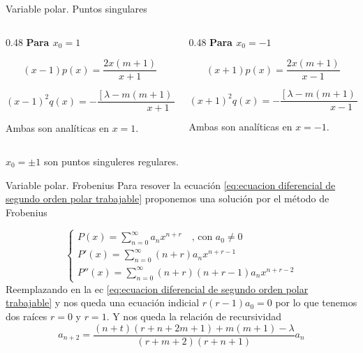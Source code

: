 \begin{frame}{Variable polar. Puntos singulares}
    \vspace{0.3cm}

    \begin{columns}[T]

        \begin{column}{0.48\textwidth}
            \centering
            \textbf{Para $x_0=1$}

            \[
                (x-1)p(x)
                =\frac{2x(m+1)}{x+1}
            \]

            \[
                (x-1)^2q(x)
                =-\frac{[\lambda-m(m+1)](x-1)}
                {x+1}
            \]

            Ambas son analíticas en $x=1$.
        \end{column}

        \begin{column}{0.48\textwidth}
            \centering
            \textbf{Para $x_0=-1$}

            \[
                (x+1)p(x)
                =\frac{2x(m+1)}{x-1}
            \]

            \[
                (x+1)^2q(x)
                =-\frac{[\lambda-m(m+1)](x+1)}
                {x-1}
            \]

            Ambas son analíticas en $x=-1$.
        \end{column}

    \end{columns}

    \vspace{0.3cm}
	$x_0 = \pm 1$ son puntos singuleres regulares.

\end{frame}

\begin{frame}{Variable polar. Frobenius}
	Para resover la ecuación \ref{eq:ecuacion diferencial de segundo orden polar trabajable} proponemos una solución por el método de Frobenius

	\begin{equation}
		\begin{cases}
			P(x) = \sum_{n=0}^\infty a_n x^{n+r}\quad\text{, con }a_0 \neq 0	\\
			P'(x) = \sum_{n=0}^\infty \left( n+r \right)a_n x^{n+r-1} \\
			P''(x) = \sum_{n=0}^\infty \left( n+r \right) \left( n+r-1 \right) a_n x^{n+r-2}
		\end{cases}
	\end{equation}
	Reemplazando en la ec \ref{eq:ecuacion diferencial de segundo orden polar trabajable} y nos queda una ecuación indicial $r(r-1) a_0 = 0$ por lo que tenemos dos raíces $r = 0$ y $r = 1$. Y nos queda la relación de recursividad 
	\begin{equation}
		a_{n+2} = \frac{(n+t)(r+n+2m+1)+m(m+1)-\lambda }{(r+m+2)(r+n+1)}a_n
		\label{eq:recursividad de P}
	\end{equation}
	
\end{frame}


